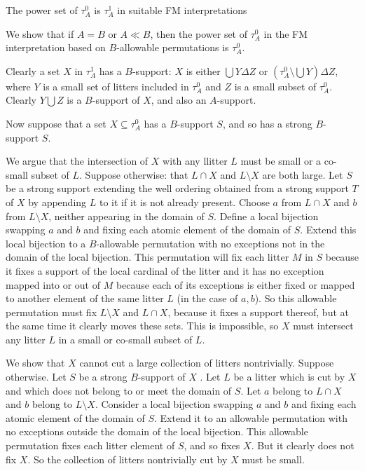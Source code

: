 \documentclass{slides}
\begin{document}
\begin{slide}

{\Large The power set of $\tau^0_A$ is $\tau^1_A$ in suitable FM interpretations}

We show that if $A=B$ or $A \ll B$, then the power set of $\tau^0_A$ in the FM interpretation based on $B$-allowable permutations is $\tau^0_A$.

Clearly a set $X$ in $\tau^1_A$ has a $B$-support:  $X$ is either $\bigcup Y \Delta Z$ or $(\tau^0_A \setminus \bigcup Y) \Delta Z$, where $Y$ is a small set
of litters included in $\tau^0_A$ and $Z$ is a small subset of $\tau^0_A$.  Clearly $Y \bigcup Z$ is a $B$-support of $X$, and also an $A$-support.

Now suppose that a set $X \subseteq \tau^0_A$ has a $B$-support $S$, and so has a strong $B$-support $S$.

We argue that the intersection of $X$ with any llitter $L$ must be small or a co-small subset of $L$.  Suppose otherwise:  that $L \cap X$ and $L \setminus X$ are both large.
Let $S$ be a strong support extending the well ordering obtained from a strong support $T$ of $X$ by appending $L$ to it if it is not already present.  Choose $a$ from $L \cap X$ and $b$ from $L \setminus X$, neither appearing in the domain of $S$.  Define a local bijection swapping $a$ and $b$ and fixing each atomic element of the domain of $S$.  Extend this local bijection to
a $B$-allowable permutation with no exceptions not in the domain of the local bijection.  This permutation will fix each litter $M$ in $S$ because it fixes a support of the local cardinal of the litter
and it has no exception mapped into or out of $M$ because each of its exceptions is either fixed or mapped to another element of the same litter $L$ (in the case of $a,b$).
So this allowable permutation must fix $L \setminus X$ and $L \cap X$, because it fixes a support thereof, but at the same time it clearly moves these sets.  This is impossible,
so $X$ must intersect any litter $L$ in a small or co-small subset of $L$.

We show that $X$ cannot cut a large collection of litters nontrivially.  Suppose otherwise.  Let $S$ be a strong $B$-support of $X$ .  Let $L$ be a litter which is cut by $X$
and which does not belong to or meet the domain of $S$.  Let $a$ belong to $L \cap X$ and $b$ belong to $L \setminus X$.  Consider a local bijection swapping $a$ and $b$ and fixing each atomic element of the domain of $S$.  Extend it to an allowable permutation with no exceptions outside the domain of the local bijection.  This allowable permutation fixes each litter
element of $S$, and so fixes $X$.  But it clearly does not fix $X$.  So the collection of litters nontrivially cut by $X$ must be small.


\end{slide}
\end{document}
